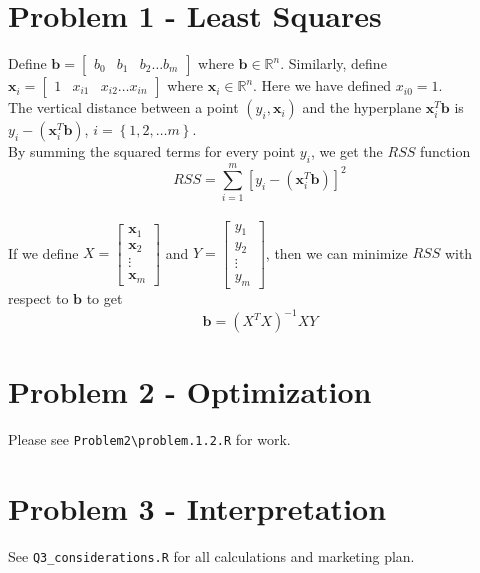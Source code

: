 \documentclass{article}
\begin{document}
\section*{Problem 1 - Least Squares}
Define $\textbf{b} = \begin{bmatrix}  b_{0} & b_{1} & b_{2} \dots b_{m} \end{bmatrix}$ where $\textbf{b} \in \mathbb{R}^{n}$. Similarly, 
define $\textbf{x}_{i} = \begin{bmatrix} 1 & x_{i1} & x_{i2} \dots x_{in}\end{bmatrix}$ where $\textbf{x}_{i} \in \mathbb{R}^{n}$. Here we have 
defined $x_{i0} = 1$. \\

The vertical distance between a point $(y_i,\textbf{x}_i)$ and the hyperplane $\textbf{x}_i^T \textbf{b}$ is 
$y_i - (\textbf{x}_i^T \textbf{b})$, $i = \left\{ 1,2,\dots m \right\}$. \\

By summing the squared terms for every point $y_i$, we get the $RSS$ function \\
\begin{equation*}
RSS = \sum_{i=1}^m \left[y_i - \left(\textbf{x}_i^T \textbf{b}\right)\right]^2
\end{equation*} \\

If we define $X = 
\begin{bmatrix}
	\textbf{x}_1 \\
	\textbf{x}_2 \\
	\vdots \\
	\textbf{x}_m
\end{bmatrix}$  
and $Y = 
\begin{bmatrix}
	y_1 \\
	y_2 \\
	\vdots \\
	y_m
\end{bmatrix}$, then we can minimize $RSS$ with respect to $\textbf{b}$ to get 
\begin{equation*}
	\textbf{b} = \left( X^T X \right) ^{-1} X Y
\end{equation*}

\section*{Problem 2 - Optimization}
Please see \texttt{Problem2\textbackslash problem.1.2.R} for work.

\section*{Problem 3 - Interpretation}
See \texttt{Q3\_considerations.R} for all calculations and marketing plan. \\
\end{document}
